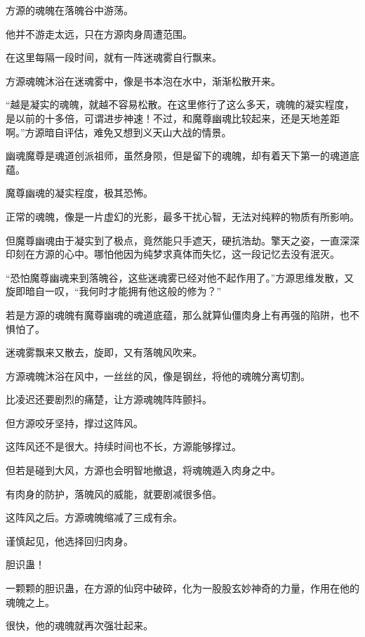 
\begin{this_body}



方源的魂魄在落魄谷中游荡。

他并不游走太远，只在方源肉身周遭范围。

在这里每隔一段时间，就有一阵迷魂雾自行飘来。

方源魂魄沐浴在迷魂雾中，像是书本泡在水中，渐渐松散开来。

“越是凝实的魂魄，就越不容易松散。在这里修行了这么多天，魂魄的凝实程度，是以前的十多倍，可谓进步神速！不过，和魔尊幽魂比较起来，还是天地差距啊。”方源暗自评估，难免又想到义天山大战的情景。

幽魂魔尊是魂道创派祖师，虽然身陨，但是留下的魂魄，却有着天下第一的魂道底蕴。

魔尊幽魂的凝实程度，极其恐怖。

正常的魂魄，像是一片虚幻的光影，最多干扰心智，无法对纯粹的物质有所影响。

但魔尊幽魂由于凝实到了极点，竟然能只手遮天，硬抗浩劫。擎天之姿，一直深深印刻在方源的心中。哪怕他因为纯梦求真体而失忆，这一段记忆去没有泯灭。

“恐怕魔尊幽魂来到落魄谷，这些迷魂雾已经对他不起作用了。”方源思维发散，又旋即暗自一叹，“我何时才能拥有他这般的修为？”

若是方源的魂魄有魔尊幽魂的魂道底蕴，那么就算仙僵肉身上有再强的陷阱，也不惧怕了。

迷魂雾飘来又散去，旋即，又有落魄风吹来。

方源魂魄沐浴在风中，一丝丝的风，像是钢丝，将他的魂魄分离切割。

比凌迟还要剧烈的痛楚，让方源魂魄阵阵颤抖。

但方源咬牙坚持，撑过这阵风。

这阵风还不是很大。持续时间也不长，方源能够撑过。

但若是碰到大风，方源也会明智地撤退，将魂魄遁入肉身之中。

有肉身的防护，落魄风的威能，就要剧减很多倍。

这阵风之后。方源魂魄缩减了三成有余。

谨慎起见，他选择回归肉身。

胆识蛊！

一颗颗的胆识蛊，在方源的仙窍中破碎，化为一股股玄妙神奇的力量，作用在他的魂魄之上。

很快，他的魂魄就再次强壮起来。


\end{this_body}
